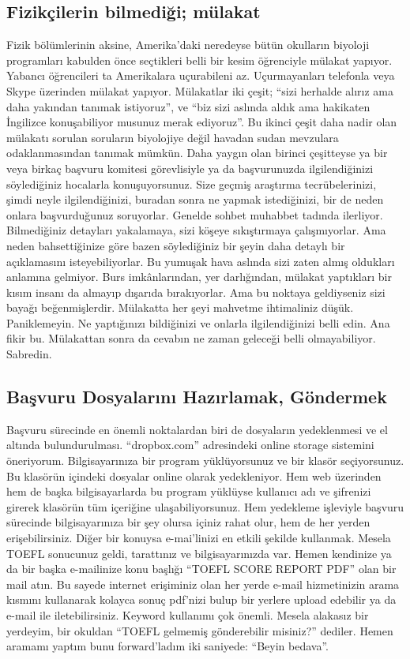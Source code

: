 \documentclass[12pt]{article}
\theoremstyle{break}
\begin{document}
\subsection{Fizikçilerin bilmediği; mülakat}
Fizik bölümlerinin aksine, Amerika’daki neredeyse bütün okulların biyoloji programları kabulden önce seçtikleri belli bir kesim öğrenciyle mülakat yapıyor. Yabancı öğrencileri ta Amerikalara uçurabileni az. Uçurmayanları telefonla veya Skype üzerinden mülakat yapıyor. Mülakatlar iki çeşit; “sizi herhalde alırız ama daha yakından tanımak istiyoruz”, ve “biz sizi aslında aldık ama hakikaten İngilizce konuşabiliyor musunuz merak ediyoruz”. Bu ikinci çeşit daha nadir olan mülakatı sorulan soruların biyolojiye değil havadan sudan mevzulara odaklanmasından tanımak mümkün. Daha yaygın olan birinci çeşitteyse ya bir veya birkaç başvuru komitesi görevlisiyle ya da başvurunuzda ilgilendiğinizi söylediğiniz hocalarla konuşuyorsunuz. Size geçmiş araştırma tecrübelerinizi, şimdi neyle ilgilendiğinizi, buradan sonra ne yapmak istediğinizi, bir de neden onlara başvurduğunuz soruyorlar. Genelde sohbet muhabbet tadında ilerliyor. Bilmediğiniz detayları yakalamaya, sizi köşeye sıkıştırmaya çalışmıyorlar. Ama neden bahsettiğinize göre bazen söylediğiniz bir şeyin daha detaylı bir açıklamasını isteyebiliyorlar. Bu yumuşak hava aslında sizi zaten almış oldukları anlamına gelmiyor. Burs imkânlarından, yer darlığından, mülakat yaptıkları bir kısım insanı da almayıp dışarıda bırakıyorlar. Ama bu noktaya geldiyseniz sizi bayağı beğenmişlerdir. Mülakatta her şeyi mahvetme ihtimaliniz düşük. Paniklemeyin. Ne yaptığınızı bildiğinizi ve onlarla ilgilendiğinizi belli edin. Ana fikir bu. Mülakattan sonra da cevabın ne zaman geleceği belli olmayabiliyor. Sabredin. 

\subsection{Başvuru Dosyalarını Hazırlamak, Göndermek}

Başvuru sürecinde en önemli noktalardan biri de dosyaların yedeklenmesi ve el altında bulundurulması. “dropbox.com” adresindeki online storage sistemini öneriyorum. Bilgisayarınıza bir program yüklüyorsunuz ve bir klasör seçiyorsunuz. Bu klasörün içindeki dosyalar online olarak yedekleniyor. Hem web üzerinden hem de başka bilgisayarlarda bu program yüklüyse kullanıcı adı ve şifrenizi girerek klasörün tüm içeriğine ulaşabiliyorsunuz.  Hem yedekleme işleviyle başvuru sürecinde bilgisayarınıza bir şey olursa içiniz rahat olur, hem de her yerden erişebilirsiniz. Diğer bir konuysa e-mai’linizi en etkili şekilde kullanmak. Mesela TOEFL sonucunuz geldi, tarattınız ve bilgisayarınızda var. Hemen kendinize ya da bir başka e-mailinize konu başlığı “TOEFL SCORE REPORT PDF” olan bir mail atın. Bu sayede internet erişiminiz olan her yerde e-mail hizmetinizin arama kısmını kullanarak kolayca sonuç pdf’nizi bulup bir yerlere upload edebilir ya da e-mail ile iletebilirsiniz. Keyword kullanımı çok önemli. Mesela alakasız bir yerdeyim, bir okuldan “TOEFL gelmemiş gönderebilir misiniz?” dediler. Hemen aramamı yaptım bunu forward’ladım iki saniyede: “Beyin bedava”.
\end{document}
